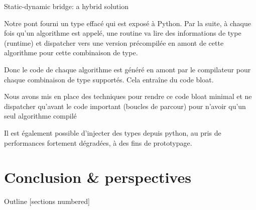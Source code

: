 \documentclass[12pt,aspectratio=169]{beamer}
\begin{document}
\begin{frame}{Static-dynamic bridge: a hybrid solution}
{    Notre pont fourni un type effacé qui est exposé à Python. Par la suite, à chaque fois qu'un algorithme est appelé, une routine va lire des informations de type (runtime) et dispatcher vers une version précompilée en amont de cette algorithme pour cette combinaison de type.

    Donc le code de chaque algorithme est généré en amont par le compilateur pour chaque combinaison de type supportés. Cela entraîne du code bloat.

    Nous avons mis en place des techniques pour rendre ce code bloat minimal et ne dispatcher qu'avant le code important (boucles de parcour) pour n'avoir qu'un seul algorithme compilé

    Il est également possible d'injecter des types depuis python, au pris de performances fortement dégradées, à des fins de prototypage.
  }
\end{frame}

%
%
%

\section[Conclusion \& perspectives]{Conclusion \& perspectives}

\begin{frame}{Outline}
  [sections numbered]
  \vspace{0.2cm}
  \small%
  \tableofcontents[currentsection]
  \pdfcomment[icon=Note]{   }
\end{frame}
\end{document}
